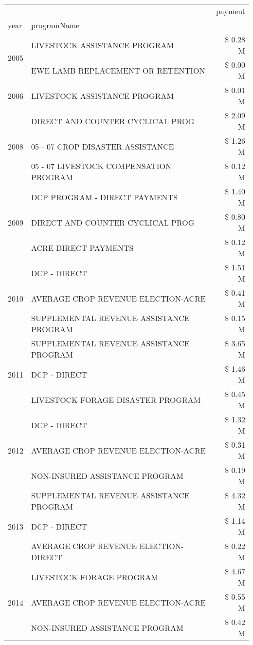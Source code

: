 \begin{tabular}{llr}
\toprule
 &  & payment \\
year & programName &  \\
\midrule
\multirow[t]{2}{*}{2005} & LIVESTOCK ASSISTANCE PROGRAM & \$ 0.28 M \\
 & EWE LAMB REPLACEMENT OR RETENTION & \$ 0.00 M \\
\cline{1-3}
2006 & LIVESTOCK ASSISTANCE PROGRAM & \$ 0.01 M \\
\cline{1-3}
\multirow[t]{3}{*}{2008} & DIRECT AND COUNTER CYCLICAL PROG & \$ 2.09 M \\
 & 05 - 07 CROP DISASTER ASSISTANCE & \$ 1.26 M \\
 & 05 - 07 LIVESTOCK COMPENSATION PROGRAM & \$ 0.12 M \\
\cline{1-3}
\multirow[t]{3}{*}{2009} & DCP PROGRAM - DIRECT PAYMENTS & \$ 1.40 M \\
 & DIRECT AND COUNTER CYCLICAL PROG & \$ 0.80 M \\
 & ACRE DIRECT PAYMENTS & \$ 0.12 M \\
\cline{1-3}
\multirow[t]{3}{*}{2010} & DCP - DIRECT & \$ 1.51 M \\
 & AVERAGE CROP REVENUE ELECTION-ACRE & \$ 0.41 M \\
 & SUPPLEMENTAL REVENUE ASSISTANCE PROGRAM & \$ 0.15 M \\
\cline{1-3}
\multirow[t]{3}{*}{2011} & SUPPLEMENTAL REVENUE ASSISTANCE PROGRAM & \$ 3.65 M \\
 & DCP - DIRECT & \$ 1.46 M \\
 & LIVESTOCK FORAGE DISASTER PROGRAM & \$ 0.45 M \\
\cline{1-3}
\multirow[t]{3}{*}{2012} & DCP - DIRECT & \$ 1.32 M \\
 & AVERAGE CROP REVENUE ELECTION-ACRE & \$ 0.31 M \\
 & NON-INSURED ASSISTANCE PROGRAM & \$ 0.19 M \\
\cline{1-3}
\multirow[t]{3}{*}{2013} & SUPPLEMENTAL REVENUE ASSISTANCE PROGRAM & \$ 4.32 M \\
 & DCP - DIRECT & \$ 1.14 M \\
 & AVERAGE CROP REVENUE ELECTION-DIRECT & \$ 0.22 M \\
\cline{1-3}
\multirow[t]{3}{*}{2014} & LIVESTOCK FORAGE PROGRAM & \$ 4.67 M \\
 & AVERAGE CROP REVENUE ELECTION-ACRE & \$ 0.55 M \\
 & NON-INSURED ASSISTANCE PROGRAM & \$ 0.42 M \\

\end{tabular}
